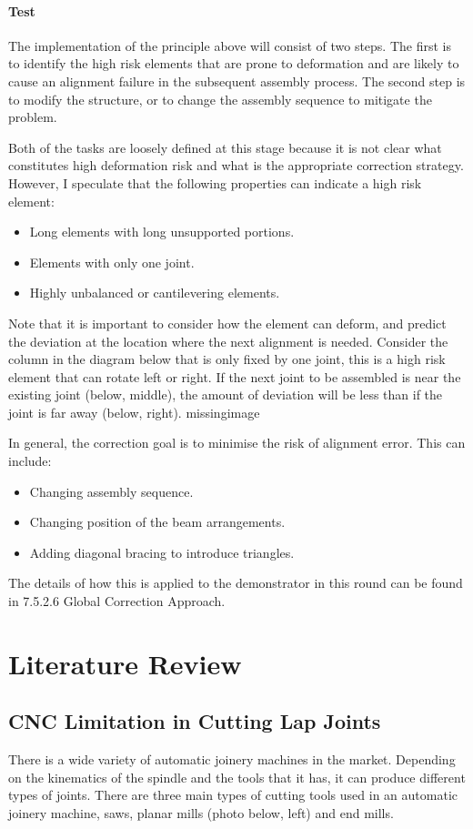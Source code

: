 \paragraph{Test}
The implementation of the principle above will consist of two steps. The first is to identify the high risk elements that are prone to deformation and are likely to cause an alignment failure in the subsequent assembly process. The second step is to modify the structure, or to change the assembly sequence to mitigate the problem.

Both of the tasks are loosely defined at this stage because it is not clear what constitutes high deformation risk and what is the appropriate correction strategy. However, I speculate that the following properties can indicate a high risk element:
\begin{itemize}
    \item Long elements with long unsupported portions.
    \item Elements with only one joint.
    \item Highly unbalanced or cantilevering elements.
\end{itemize}
Note that it is important to consider how the element can deform, and predict the deviation at the location where the next alignment is needed. Consider the column in the diagram below that is only fixed by one joint, this is a high risk element that can rotate left or right. If the next joint to be assembled is near the existing joint (below, middle), the amount of deviation will be less than if the joint is far away (below, right). 
missingimage

In general, the correction goal is to minimise the risk of alignment error. This can include:
\begin{itemize}
    \item Changing assembly sequence.
    \item Changing position of the beam arrangements.
    \item Adding diagonal bracing to introduce triangles.
\end{itemize}
The details of how this is applied to the demonstrator in this round can be found in 7.5.2.6 Global Correction Approach.

\section{Literature Review}
\subsection{CNC Limitation in Cutting Lap Joints}
There is a wide variety of automatic joinery machines in the market. Depending on the kinematics of the spindle and the tools that it has, it can produce different types of joints. There are three main types of cutting tools used in an automatic joinery machine, saws, planar mills (photo below, left) and end mills. 


